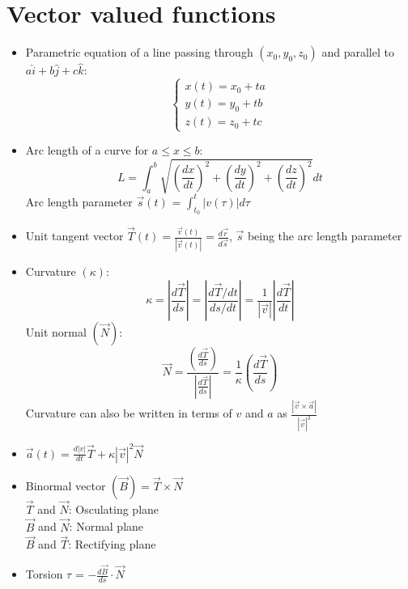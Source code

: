 \documentclass[a4paper]{article}
\begin{document}
\section{Vector valued functions}
\begin{itemize}
\item Parametric equation of a line passing through $(x_0,y_0,z_0)$ and parallel to $a\hat{i}+b\hat{j}+c\hat{k}$:
                            \[\begin{cases}
                                 x(t) = x_0+ta\\
                                 y(t) = y_0+tb\\
                                 z(t) = z_0+tc
                            \end{cases}\]
\item Arc length of a curve for $a\leq x\leq b$:
    \begin{equation*}
        L = \int_{a}^{b}\sqrt{\left(\frac{dx}{dt}\right)^2+\left(\frac{dy}{dt}\right)^2+\left(\frac{dz}{dt}\right)^2}dt
    \end{equation*}
    Arc length parameter $\vec{s}(t)$ = $\int_{t_0}^{t}|v(\tau)|d\tau$
\item Unit tangent vector $\vec{T}(t)=\frac{\vec{v}(t)}{|\vec{v}(t)|}=\frac{d\vec{r}}{d\vec{s}}$, $\vec{s}$ being the arc length parameter
\item Curvature $(\kappa)$:
        \begin{equation*}
            \kappa = \left|{\frac{d\overrightarrow{T}}{ds}}\right| = \left|{\frac{d\overrightarrow{T}/dt}{ds/dt}}\right| = \frac{1}{|\vec{v}|}\left|{\frac{d\overrightarrow{T}}{dt}}\right|
        \end{equation*}
    Unit normal $(\overrightarrow{N})$: 
        \begin{equation*}
            \overrightarrow{N} = \frac{\left(\frac{d\overrightarrow{T}}{ds}\right)}{\left|\frac{d\overrightarrow{T}}{ds}\right|} = \frac{1}{\kappa}\left(\frac{d\overrightarrow{T}}{ds}\right)
        \end{equation*}
Curvature can also be written in terms of $v$ and $a$ as $\frac{|\vec{v}\times\vec{a}|}{|\vec{v}|^3}$
\item $\vec{a}(t) = \frac{d|v|}{dt}\overrightarrow{T}+\kappa|\vec{v}|^2\overrightarrow{N}$
\item Binormal vector $(\overrightarrow{B}) = \overrightarrow{T}\times\overrightarrow{N}$ \\
$\overrightarrow{T}$ and $\overrightarrow{N}$: Osculating plane\\
$\overrightarrow{B}$ and $\overrightarrow{N}$: Normal plane\\
$\overrightarrow{B}$ and $\overrightarrow{T}$: Rectifying plane
\item Torsion $\tau$ = $-\frac{d\overrightarrow{B}}{ds}\cdot\overrightarrow{N}$
\end{itemize}
\newpage
\end{document}
